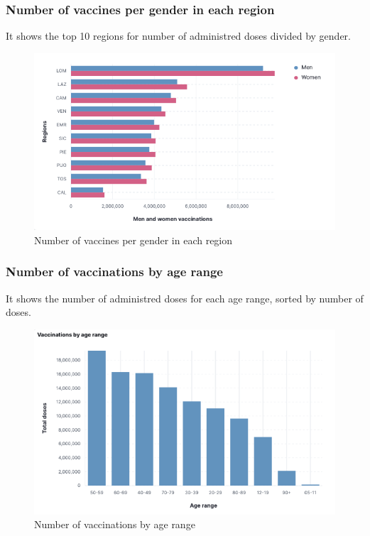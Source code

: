 \documentclass[12pt, a4paper]{article}
\begin{document}
\subsubsection{Number of vaccines per gender in each region}
It shows the top 10 regions for number of administred doses divided by gender.
\begin{figure}[H]
  \centering
  \includegraphics[width=.9\linewidth]{img (14).png}
\caption*{Number of vaccines per gender in each region}
\end{figure}

\subsubsection{Number of vaccinations by age range}
It shows the number of administred doses for each age range, sorted by number of doses.
\begin{figure}[H]
  \centering
  \includegraphics[width=.85\linewidth]{img (15).png}
\caption*{Number of vaccinations by age range}
\end{figure}
\end{document}
